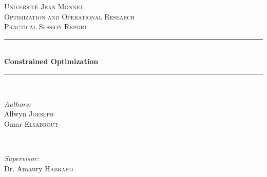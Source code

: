 \begin{titlepage}

\newcommand{\HRule}{\rule{\linewidth}{0.5mm}} %

\center %
 

\textsc{\LARGE Université Jean Monnet}\\[1.5cm] %
\textsc{\Large Optimization and Operational Research}\\[0.5cm] %
\textsc{\large Practical Session Report}\\[0.5cm] %


\HRule \\[0.4cm]
{ \huge \bfseries Constrained Optimization}\\[0.4cm] %
\HRule \\[1.5cm]
 

\begin{minipage}{0.4\textwidth}
\begin{flushleft} \large
\emph{Authors:}\\
Allwyn \textsc{Joeseph} \\
Omar \textsc{Elsabrout} %
\end{flushleft}
\end{minipage}
~
\begin{minipage}{0.4\textwidth}
\begin{flushright} \large
\emph{Supervisor:} \\
Dr. Amaury \textsc{Habrard} %
\end{flushright}
\end{minipage}\\[2cm]


\end{titlepage}
